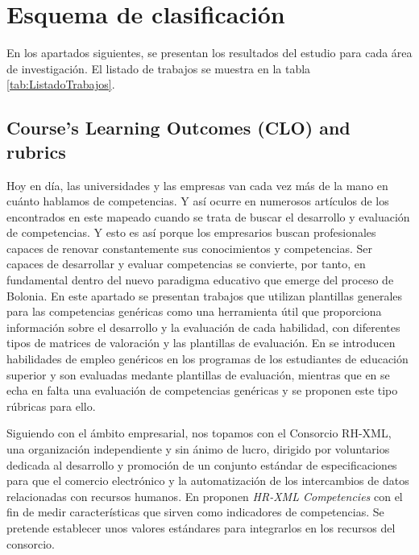 \section{Esquema de clasificación}

En los apartados siguientes, se presentan los resultados del estudio para cada área de investigación. El listado de trabajos se muestra en la tabla \ref{tab:ListadoTrabajos}.

\subsection{Course’s Learning Outcomes (CLO) and rubrics}
Hoy en día, las universidades y las empresas van cada vez más de la mano en cuánto hablamos de competencias. Y así ocurre en numerosos artículos de los encontrados en este mapeado cuando se trata de buscar el desarrollo y evaluación de competencias. Y esto es así porque los empresarios buscan profesionales capaces de renovar constantemente sus conocimientos y competencias. Ser capaces de desarrollar y evaluar competencias se convierte, por tanto, en fundamental dentro del nuevo paradigma educativo que emerge del proceso de Bolonia. En este apartado se presentan trabajos que utilizan plantillas generales para las competencias genéricas como una herramienta útil que proporciona información sobre el desarrollo y la evaluación de cada habilidad, con diferentes tipos de matrices de valoración y las plantillas de evaluación. En \cite{Terron-Lopez:2013} se introducen habilidades de empleo genéricos en los programas de los estudiantes de educación superior y son evaluadas medante plantillas de evaluación, mientras que en \cite{Feldt:2009} se echa en falta una evaluación de competencias genéricas y se proponen este tipo rúbricas para ello.

Siguiendo con el ámbito empresarial, nos topamos con el Consorcio RH-XML, una organización independiente y sin ánimo de lucro, dirigido por voluntarios dedicada al desarrollo y promoción de un conjunto estándar de especificaciones para que el comercio electrónico y la automatización de los intercambios de datos relacionadas con recursos humanos. En \cite{Adelsberger:2008} proponen \emph{HR-XML Competencies} con el fin de medir características que sirven como indicadores de competencias. Se pretende establecer unos valores estándares para integrarlos en los recursos del consorcio.

